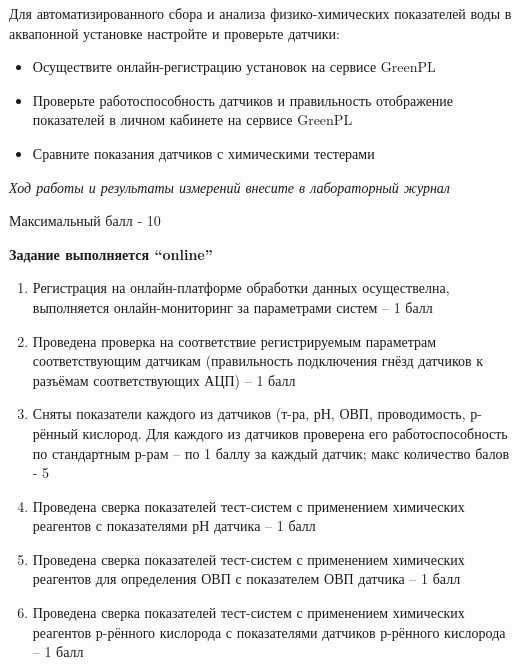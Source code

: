 
Для автоматизированного сбора и анализа физико-химических показателей воды в аквапонной установке настройте и проверьте датчики:
\begin{itemize}
    \item Осуществите онлайн-регистрацию установок на сервисе GreenPL
    \item Проверьте работоспособность датчиков и правильность отображение показателей в личном кабинете на сервисе GreenPL
    \item  Сравните показания датчиков с химическими тестерами
\end{itemize}
   
\textit{Ход работы и результаты измерений внесите в лабораторный журнал} 

Максимальный балл - 10

\textbf{Задание выполняется “online”}

\markSection

\begin{enumerate}
    \item	Регистрация на онлайн-платформе обработки данных осуществелна, выполняется онлайн-мониторинг за параметрами систем – 1 балл
    \item	Проведена проверка на соответствие регистрируемым параметрам соответствующим датчикам (правильность подключения гнёзд датчиков к разъёмам соответствующих АЦП) – 1 балл
    \item	Сняты показатели каждого из датчиков (т-ра, рН, ОВП, проводимость, р-рённый кислород. Для каждого из датчиков проверена его работоспособность по стандартным р-рам – по 1 баллу за каждый датчик; макс количество балов - 5
    \item	Проведена сверка показателей тест-систем с применением химических реагентов с показателями рН датчика – 1 балл
    \item	Проведена сверка показателей тест-систем с применением химических реагентов для определения ОВП с показателем ОВП датчика – 1 балл
    \item Проведена сверка показателей тест-систем с применением химических реагентов р-рённого кислорода с показателями датчиков р-рённого кислорода – 1 балл

\end{enumerate}